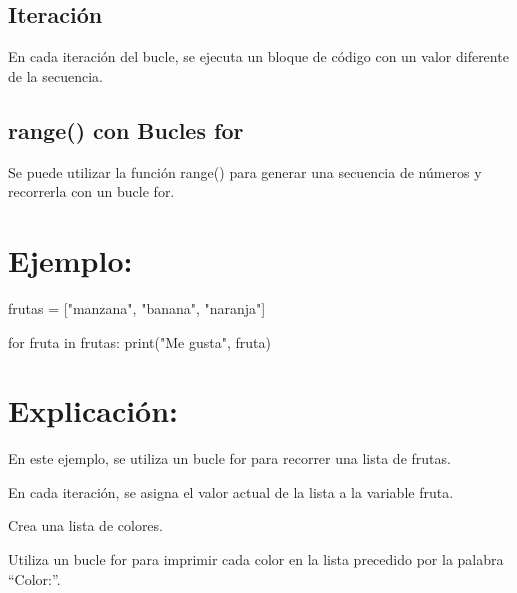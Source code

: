 \documentclass[
  a4paper,
  DIV=11,
  numbers=noendperiod,
  onepage,
  openany]{scrreprt}
\newenvironment{Shaded}{\begin{snugshade}}{\end{snugshade}}
\newcommand{\BuiltInTok}[1]{\textcolor[rgb]{0.00,0.23,0.31}{#1}}
\newcommand{\ControlFlowTok}[1]{\textcolor[rgb]{0.00,0.23,0.31}{#1}}
\newcommand{\KeywordTok}[1]{\textcolor[rgb]{0.00,0.23,0.31}{#1}}
\newcommand{\NormalTok}[1]{\textcolor[rgb]{0.00,0.23,0.31}{#1}}
\newcommand{\OperatorTok}[1]{\textcolor[rgb]{0.37,0.37,0.37}{#1}}
\newcommand{\StringTok}[1]{\textcolor[rgb]{0.13,0.47,0.30}{#1}}
\begin{document}
\hypertarget{iteraciuxf3n-1}{%
\subsection{Iteración}\label{iteraciuxf3n-1}}

En cada iteración del bucle, se ejecuta un bloque de código con un valor
diferente de la secuencia.

\hypertarget{range-con-bucles-for-1}{%
\subsection{range() con Bucles for}\label{range-con-bucles-for-1}}

Se puede utilizar la función range() para generar una secuencia de
números y recorrerla con un bucle for.

\hypertarget{ejemplo-43}{%
\section{Ejemplo:}\label{ejemplo-43}}

\begin{Shaded}
\begin{Highlighting}[]
\NormalTok{frutas }\OperatorTok{=}\NormalTok{ [}\StringTok{"manzana"}\NormalTok{, }\StringTok{"banana"}\NormalTok{, }\StringTok{"naranja"}\NormalTok{]}

\ControlFlowTok{for}\NormalTok{ fruta }\KeywordTok{in}\NormalTok{ frutas:}
    \BuiltInTok{print}\NormalTok{(}\StringTok{"Me gusta"}\NormalTok{, fruta)}
\end{Highlighting}
\end{Shaded}

\hypertarget{explicaciuxf3n-43}{%
\section{Explicación:}\label{explicaciuxf3n-43}}

En este ejemplo, se utiliza un bucle for para recorrer una lista de
frutas.

En cada iteración, se asigna el valor actual de la lista a la variable
fruta.

\begin{tcolorbox}[enhanced jigsaw, colbacktitle=quarto-callout-important-color!10!white, toprule=.15mm, leftrule=.75mm, titlerule=0mm, opacityback=0, rightrule=.15mm, opacitybacktitle=0.6, breakable, left=2mm, coltitle=black, title=\textcolor{quarto-callout-important-color}{\faExclamation}\hspace{0.5em}{Actividad Práctica:}, toptitle=1mm, bottomtitle=1mm, arc=.35mm, bottomrule=.15mm, colback=white, colframe=quarto-callout-important-color-frame]

Crea una lista de colores.

Utiliza un bucle for para imprimir cada color en la lista precedido por
la palabra ``Color:''.

\end{tcolorbox}
\end{document}
